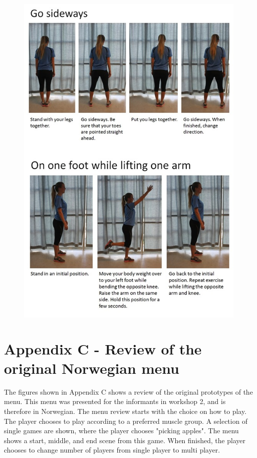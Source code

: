 \begin{figure} [H]
\centering
\includegraphics[scale=0.8]{GoSideways.jpg}
\label{app:gosideways}
\end{figure} 

\newpage
\section*{Appendix C - Review of the original Norwegian menu}
\label{app:menureview}

The figures shown in Appendix C shows a review of the original prototypes of the menu. This menu was presented for the informants in workshop 2, and is therefore in Norwegian. The menu review starts with the choice on how to play. The player chooses to play according to a preferred muscle group. A selection of single games are shown, where the player chooses "picking apples". The menu shows a start, middle, and end scene from this game. When finished, the player chooses to change number of players from single player to multi player.  

